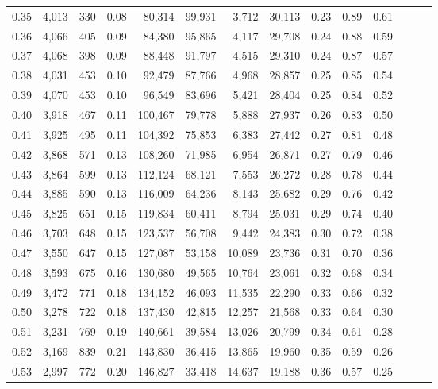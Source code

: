 \begin{tabular}{rrrrrrrrrrrrrr}
0.35 &  4,013 &  330 &  0.08 &   80,314 &   99,931 &   3,712 &  30,113 &  0.23 &  0.89 &      0.61 \\
0.36 &  4,066 &  405 &  0.09 &   84,380 &   95,865 &   4,117 &  29,708 &  0.24 &  0.88 &      0.59 \\
0.37 &  4,068 &  398 &  0.09 &   88,448 &   91,797 &   4,515 &  29,310 &  0.24 &  0.87 &      0.57 \\
0.38 &  4,031 &  453 &  0.10 &   92,479 &   87,766 &   4,968 &  28,857 &  0.25 &  0.85 &      0.54 \\
0.39 &  4,070 &  453 &  0.10 &   96,549 &   83,696 &   5,421 &  28,404 &  0.25 &  0.84 &      0.52 \\
0.40 &  3,918 &  467 &  0.11 &  100,467 &   79,778 &   5,888 &  27,937 &  0.26 &  0.83 &      0.50 \\
0.41 &  3,925 &  495 &  0.11 &  104,392 &   75,853 &   6,383 &  27,442 &  0.27 &  0.81 &      0.48 \\
0.42 &  3,868 &  571 &  0.13 &  108,260 &   71,985 &   6,954 &  26,871 &  0.27 &  0.79 &      0.46 \\
0.43 &  3,864 &  599 &  0.13 &  112,124 &   68,121 &   7,553 &  26,272 &  0.28 &  0.78 &      0.44 \\
0.44 &  3,885 &  590 &  0.13 &  116,009 &   64,236 &   8,143 &  25,682 &  0.29 &  0.76 &      0.42 \\
0.45 &  3,825 &  651 &  0.15 &  119,834 &   60,411 &   8,794 &  25,031 &  0.29 &  0.74 &      0.40 \\
0.46 &  3,703 &  648 &  0.15 &  123,537 &   56,708 &   9,442 &  24,383 &  0.30 &  0.72 &      0.38 \\
0.47 &  3,550 &  647 &  0.15 &  127,087 &   53,158 &  10,089 &  23,736 &  0.31 &  0.70 &      0.36 \\
0.48 &  3,593 &  675 &  0.16 &  130,680 &   49,565 &  10,764 &  23,061 &  0.32 &  0.68 &      0.34 \\
0.49 &  3,472 &  771 &  0.18 &  134,152 &   46,093 &  11,535 &  22,290 &  0.33 &  0.66 &      0.32 \\
0.50 &  3,278 &  722 &  0.18 &  137,430 &   42,815 &  12,257 &  21,568 &  0.33 &  0.64 &      0.30 \\
0.51 &  3,231 &  769 &  0.19 &  140,661 &   39,584 &  13,026 &  20,799 &  0.34 &  0.61 &      0.28 \\
0.52 &  3,169 &  839 &  0.21 &  143,830 &   36,415 &  13,865 &  19,960 &  0.35 &  0.59 &      0.26 \\
0.53 &  2,997 &  772 &  0.20 &  146,827 &   33,418 &  14,637 &  19,188 &  0.36 &  0.57 &      0.25 \\

\end{tabular}
